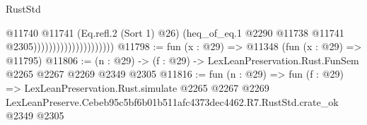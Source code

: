 \begin{lexlean}{RustStd}
\begin{coremodule}
                                          @11740
                                            @11741
                                            (Eq.refl.{2} (Sort 1) @26)
                                            (heq_of_eq.{1}
                                              @2290
                                              @11738
                                              @11741
                                              @2305)))))))))))))))))))))
@11798 := fun (x : @29) => @11348 (fun (x : @29) => @11795)
@11806 := (n : @29) -> (f : @29) -> LexLeanPreservation.Rust.FunSem @2265 @2267 @2269 @2349 @2305
@11816 := fun (n : @29) =>
  fun (f : @29) =>
  LexLeanPreservation.Rust.simulate
    @2265
    @2267
    @2269
    LexLeanPreserve.Cebeb95c5bf6b01b511afc4373dec4462.R7.RustStd.crate_ok
    @2349
    @2305
\end{coremodule}
\end{lexlean}
